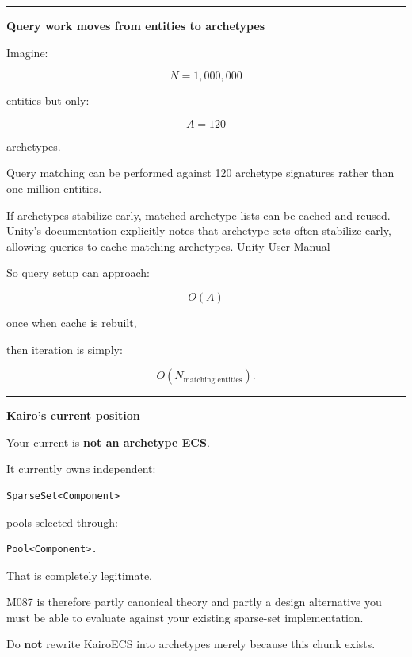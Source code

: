 \begin{center}\rule{0.5\linewidth}{0.5pt}\end{center}

\textbf{Query work moves from entities to archetypes}

Imagine:

\[
N=1,000,000
\]

entities but only:

\[
A=120
\]

archetypes.

Query matching can be performed against 120 archetype signatures rather than one million entities.

If archetypes stabilize early, matched archetype lists can be cached and reused. Unity's documentation explicitly notes that archetype sets often stabilize early, allowing queries to cache matching archetypes. \href{https://docs.unity.cn/Packages/com.unity.entities\%401.0/manual/concepts-archetypes.html?utm_source=chatgpt.com}{Unity User Manual}

So query setup can approach:

\[
O(A)
\]

once when cache is rebuilt,

then iteration is simply:

\[
O(N_{\text{matching entities}}).
\]

\begin{center}\rule{0.5\linewidth}{0.5pt}\end{center}

\textbf{Kairo's current position}

Your current  is \textbf{not an archetype ECS}.

It currently owns independent:

\begin{verbatim}
SparseSet<Component>
\end{verbatim}

pools selected through:

\begin{verbatim}
Pool<Component>.
\end{verbatim}

That is completely legitimate.

M087 is therefore partly canonical theory and partly a design alternative you must be able to evaluate against your existing sparse-set implementation.

Do \textbf{not} rewrite KairoECS into archetypes merely because this chunk exists.

